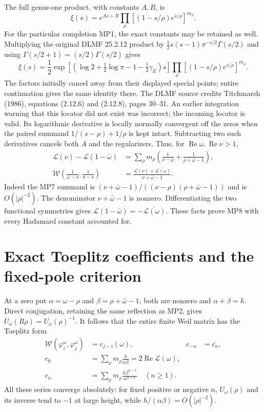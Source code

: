 \documentclass[11pt]{article}
\newcommand{\W}{\mathcal W}
\newcommand{\LL}{\mathscr L}
\newcommand{\Rea}{\operatorname{Re}}
\begin{document}
The full genus-one product, with constants $A,B$, is
\begin{equation}
 \xi(s)=e^{As+B}\prod_\rho
       \left[(1-s/\rho)e^{s/\rho}\right]^{m_\rho}.
 \tag{MP6}
\end{equation}
For the particular completion MP1, the exact constants may be retained
as well. Multiplying the original DLMF 25.2.12 product by
$\tfrac12s(s-1)\pi^{-s/2}\Gamma(s/2)$ and using
$\Gamma(s/2+1)=(s/2)\Gamma(s/2)$ gives
\begin{equation}
 \xi(s)=\frac12\exp\!\left[
  \left(\log2+\tfrac12\log\pi-1-\tfrac12\gamma_E\right)s\right]
 \prod_\rho\left[(1-s/\rho)e^{s/\rho}\right]^{m_\rho}.
 \tag{MP6a}
\end{equation}
The factors initially cancel away from their displayed special points;
entire continuation gives the same identity there. The DLMF source
credits Titchmarsh (1986), equations (2.12.6) and (2.12.8), pages 30--31.
An earlier integration warning that this locator did not exist was
incorrect; the incoming locator is valid.
Its logarithmic derivative is locally normally convergent off the zeros
when the paired summand $1/(s-\rho)+1/\rho$ is kept intact. Subtracting
two such derivatives cancels both $A$ and the regularizers. Thus, for
$\Rea\omega,\Rea\nu>1$,
\begin{align}
 \LL(\nu)-\LL(1-\bar\omega)
 &=\sum_\rho m_\rho
       \left(\frac1{\nu-\rho}+\frac1{\rho+\bar\omega-1}\right),\tag{MP7}\\
 \W\left(\frac1{\omega-s},\frac1{\nu-s}\right)
 &=\frac{\LL(\nu)+\overline{\LL(\omega)}}{\nu+\bar\omega-1}.
 \tag{MP8}
\end{align}
Indeed the MP7 summand is
$(\nu+\bar\omega-1)/((\nu-\rho)(\rho+\bar\omega-1))$ and is
$O(|\rho|^{-2})$. The denominator $\nu+\bar\omega-1$ is nonzero.
Differentiating the two functional symmetries gives
$\LL(1-\bar\omega)=-\overline{\LL(\omega)}$. These facts prove MP8
with every Hadamard constant accounted for.

\section{Exact Toeplitz coefficients and the fixed-pole criterion}
At a zero put $\alpha=\omega-\rho$ and $\beta=\rho+\bar\omega-1$;
both are nonzero and $\alpha+\beta=h$. Direct conjugation, retaining the
same reflection as MP2, gives
$\overline{U_\omega(R\rho)}=U_\omega(\rho)^{-1}$.
It follows that the entire finite Weil matrix has the Toeplitz form
\begin{align}
 \W(\varphi_i^\omega,\varphi_j^\omega)&=c_{j-i}(\omega),
   &c_{-n}&=\overline{c_n},\tag{MP9}\\
 c_0&=\sum_\rho m_\rho\frac h{\alpha\beta}
             =2\Rea\LL(\omega),\tag{MP10}\\
 c_n&=\sum_\rho m_\rho\frac{h\beta^{n-1}}{\alpha^{n+1}}
       \quad(n\geq1).\tag{MP11}
\end{align}
All these series converge absolutely: for fixed positive or negative
$n$, $U_\omega(\rho)$ and its inverse tend to $-1$ at large height,
while $h/(\alpha\beta)=O(|\rho|^{-2})$.
\end{document}

